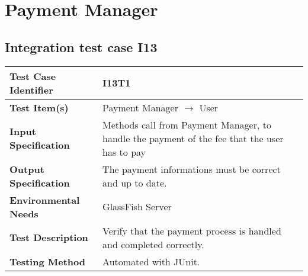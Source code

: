 \section{ Payment Manager}
\subsection{Integration test case I13}

\begin{tabular}{l p{}}
    \hline
    \textbf{Test Case Identifier} & I13T1\\
    \hline
    \textbf{Test Item(s)} & Payment Manager $\rightarrow$ User\\
    \hline
    \textbf{Input Specification} & Methods call from Payment Manager, to handle the payment of the fee that the user has to pay \\
    \hline
    \textbf{Output Specification} & The payment informations must be correct and up to date.\\
    \hline
    \textbf{Environmental Needs} &  GlassFish Server\\
    \hline
    \textbf{Test Description} & Verify that the payment process is handled and completed correctly.\\
    \hline
    \textbf{Testing Method} & Automated with JUnit.\\
    \hline
\end{tabular}